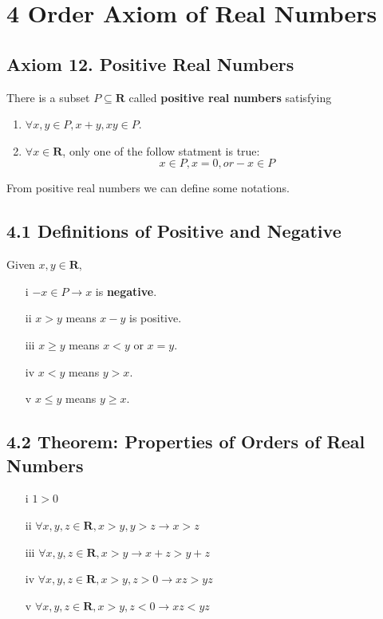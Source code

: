 \documentclass{article}
\begin{document}
\section*{4 Order Axiom of Real Numbers}
\subsection*{Axiom 12. Positive Real Numbers}
There is a subset $P \subseteq \mathbf{R}$ called \textbf{positive real numbers} satisfying
\begin{enumerate}
    \item $\forall x, y \in P, x+y, xy \in P$.
    \item $\forall x \in \mathbf{R}$, only one of the follow statment is true:
    \begin{equation*}
        x \in P, x = 0, or -x \in P
    \end{equation*}
\end{enumerate}
From positive real numbers we can define some notations.
\subsection*{4.1 Definitions of Positive and Negative}
Given $x, y \in \mathbf{R}$,
\begin{itemize}
    \item[i] $-x \in P \rightarrow x$  is \textbf{negative}.
    \item[ii] $x > y$ means $x-y$ is positive.
    \item[iii] $x \geq y$ means $x < y$ or $x = y$.
    \item[iv] $x < y$ means $y > x$.
    \item[v] $x \leq y$ means $y \geq x$.
\end{itemize}
\subsection*{4.2 Theorem: Properties of Orders of Real Numbers}
\begin{enumerate}
    \item[i] $1 > 0$
    \item[ii] $\forall x, y, z \in \mathbf{R}, x > y, y > z \rightarrow x > z$
    \item[iii] $\forall x, y, z \in \mathbf{R}, x > y \rightarrow x+z > y+z$
    \item[iv] $\forall x, y, z \in \mathbf{R}, x > y, z > 0 \rightarrow xz > yz$
    \item[v] $\forall x, y, z \in \mathbf{R}, x > y, z < 0 \rightarrow xz < yz$
\end{enumerate}
\end{document}
